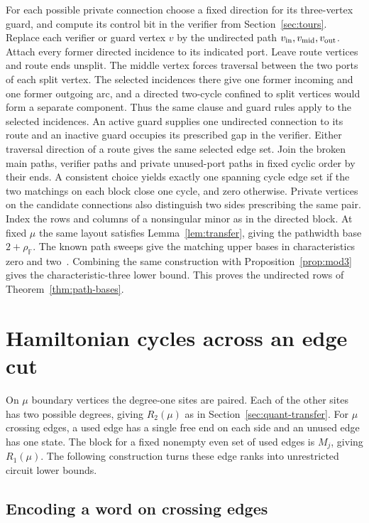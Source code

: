 \documentclass[11pt]{article}
\theoremstyle{definition}
\newcommand{\F}{\mathbb F}
\begin{document}
For each possible private connection choose a fixed direction for its three-vertex guard, and compute its control bit in the verifier from Section~\ref{sec:tours}. Replace each verifier or guard vertex \(v\) by the undirected path \(v_{\rm in},v_{\rm mid},v_{\rm out}\). Attach every former directed incidence to its indicated port. Leave route vertices and route ends unsplit. The middle vertex forces traversal between the two ports of each split vertex. The selected incidences there give one former incoming and one former outgoing arc, and a directed two-cycle confined to split vertices would form a separate component. Thus the same clause and guard rules apply to the selected incidences. An active guard supplies one undirected connection to its route and an inactive guard occupies its prescribed gap in the verifier. Either traversal direction of a route gives the same selected edge set. Join the broken main paths, verifier paths and private unused-port paths in fixed cyclic order by their ends. A consistent choice yields exactly one spanning cycle edge set if the two matchings on each block close one cycle, and zero otherwise. Private vertices on the candidate connections also distinguish two sides prescribing the same pair. Index the rows and columns of a nonsingular minor as in the directed block. At fixed \(\mu\) the same layout satisfies Lemma~\ref{lem:transfer}, giving the pathwidth base \(2+\rho_\F\). The known path sweeps give the matching upper bases in characteristics zero and two~\cite{bckn,ckn}. Combining the same construction with Proposition~\ref{prop:mod3} gives the characteristic-three lower bound. This proves the undirected rows of Theorem~\ref{thm:path-bases}.

\section{Hamiltonian cycles across an edge cut}\label{sec:layouts}

On \(\mu\) boundary vertices the degree-one sites are paired. Each of the other sites has two possible degrees, giving \(R_2(\mu)\) as in Section~\ref{sec:quant-transfer}. For \(\mu\) crossing edges, a used edge has a single free end on each side and an unused edge has one state. The block for a fixed nonempty even set of used edges is \(M_j\), giving \(R_1(\mu)\). The following construction turns these edge ranks into unrestricted circuit lower bounds.

\subsection{Encoding a word on crossing edges}\label{sec:cut-blocks}
\end{document}

